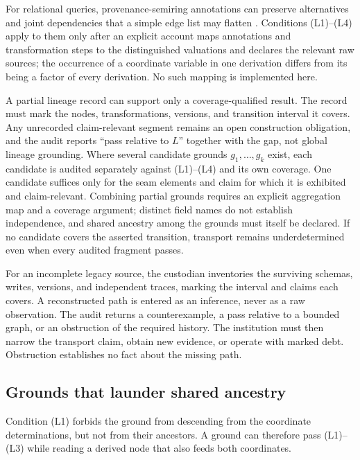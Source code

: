 \documentclass[smallextended,envcountsect,envcountsame,natbib]{svjour3}
\begin{document}
For relational queries, provenance-semiring annotations can preserve alternatives and joint dependencies that a simple edge list may flatten \citep{greenkarvounarakistannen2007}. Conditions (L1)--(L4) apply to them only after an explicit account maps annotations and transformation steps to the distinguished valuations and declares the relevant raw sources; the occurrence of a coordinate variable in one derivation differs from its being a factor of every derivation. No such mapping is implemented here.

A partial lineage record can support only a coverage-qualified result. The record must mark the nodes, transformations, versions, and transition interval it covers. Any unrecorded claim-relevant segment remains an open construction obligation, and the audit reports ``pass relative to $L$'' together with the gap, not global lineage grounding. Where several candidate grounds $g_1,\ldots,g_k$ exist, each candidate is audited separately against (L1)--(L4) and its own coverage. One candidate suffices only for the seam elements and claim for which it is exhibited and claim-relevant. Combining partial grounds requires an explicit aggregation map and a coverage argument; distinct field names do not establish independence, and shared ancestry among the grounds must itself be declared. If no candidate covers the asserted transition, transport remains underdetermined even when every audited fragment passes.

For an incomplete legacy source, the custodian inventories the surviving schemas, writes, versions, and independent traces, marking the interval and claims each covers. A reconstructed path is entered as an inference, never as a raw observation. The audit returns a counterexample, a pass relative to a bounded graph, or an obstruction of the required history. The institution must then narrow the transport claim, obtain new evidence, or operate with marked debt. Obstruction establishes no fact about the missing path.

\subsection{Grounds that launder shared ancestry}\label{ex:sec:laundering}

Condition (L1) forbids the ground from descending from the coordinate determinations, but not from their ancestors. A ground can therefore pass (L1)--(L3) while reading a derived node that also feeds both coordinates.
\end{document}
